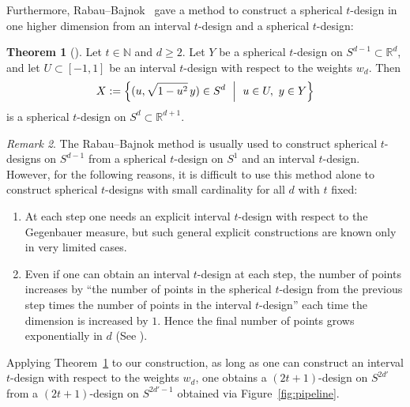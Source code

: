 \documentclass{amsart}
\theoremstyle{definition}
\newtheorem{theorem}{Theorem}[section]
\theoremstyle{remark}
\newtheorem{remark}[theorem]{Remark}
\numberwithin{equation}{section}
\newcommand{\R}{{\mathbb R}}
\newcommand{\N}{{\mathbb N}}
\begin{document}
Furthermore, Rabau--Bajnok~\cite{RB1991} gave a method to construct a spherical $t$-design in one higher dimension from an interval $t$-design and a spherical $t$-design:

\begin{theorem}[{\cite[Theorem~4.1]{RB1991}}]\label{thm:rabaubajnok}
Let $t\in\N$ and $d\ge 2$.
Let $Y$ be a spherical $t$-design on $S^{d-1}\subset\R^{d}$, and let $U\subset[-1,1]$ be an interval $t$-design with respect to the weights $w_d$.
Then
\[
  X
  :=\Bigl\{
    (u, \sqrt{1-u^2}\, y)\in S^{d}
    \ \Bigm|\ 
    u\in U,\ y\in Y
  \Bigr\}
\]
is a spherical $t$-design on $S^{d}\subset\R^{d+1}$.
\end{theorem}

\begin{remark}
The Rabau--Bajnok method is usually used to construct spherical $t$-designs on $S^{d-1}$ from a spherical $t$-design on $S^{1}$ and an interval $t$-design.
However, for the following reasons, it is difficult to use this method alone to construct spherical $t$-designs with small cardinality for all $d$ with $t$ fixed:
\begin{enumerate}
  \item At each step one needs an explicit interval $t$-design with respect to the Gegenbauer measure,
  but such general explicit constructions are known only in very limited cases.
  \item Even if one can obtain an interval $t$-design at each step, the number of points increases by
  ``the number of points in the spherical $t$-design from the previous step times the number of points in the interval $t$-design''
  each time the dimension is increased by $1$.
  Hence the final number of points grows exponentially in $d$   (See \cite{Kuperberg2006,Baladram-phd}).
\end{enumerate}
\end{remark}

Applying Theorem~\ref{thm:rabaubajnok} to our construction, as long as one can construct an interval $t$-design with respect to the weights $w_d$,
one obtains a $(2t+1)$-design on $S^{2d'}$ from a $(2t+1)$-design on $S^{2d'-1}$ obtained via Figure~\ref{fig:pipeline}.
\end{document}
